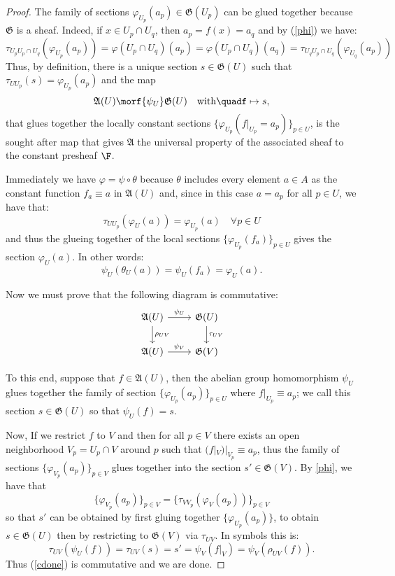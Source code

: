 \begin{proof}
The family of sections $\varphi_{U_p}(a_p)\in \mathfrak{G}(U_p)$ can be glued together
because $\mathfrak{G}$ is a sheaf. Indeed, if $x\in U_p\cap U_q$, then $a_p=f(x)=a_q$
and by (\ref{phi}) we have:
\[
	\tau_{U_p U_p\cap U_q}(\varphi_{U_p}(a_p))=\varphi(U_p\cap U_q)(a_p)=%
	\varphi(U_p\cap U_q)(a_q)=\tau_{U_q U_p\cap U_q}(\varphi_{U_q}(a_p))
\]
Thus, by definition, there is a unique section $s\in\mathfrak{G}(U)$ such that
$\tau_{U U_p}(s)=\varphi_{U_p}(a_p)$ and the map
\[
	\mathfrak{A}(U)\morf{\psi_U}\mathfrak{G}(U) \quad\text{with}\quad%
	f\mapsto s,
\]
that glues together the locally constant sections
$\{\varphi_{U_p}(f|_{U_p}=a_p)\}_{p\in U}$,
is the sought after map that gives $\mathfrak{A}$ the universal property of the
associated sheaf to the constant presheaf $\F$.

Immediately we have $\varphi=\psi\circ\theta$ because $\theta$ includes every
element $a\in A$ as the constant function $f_a\equiv a$ in $\mathfrak{A}(U)$ and,
since in this case $a=a_p$ for all $p\in U$, we have that:
\[
	\tau_{U U_p}(\varphi_U(a))=\varphi_{U_p}(a)  \quad\forall p\in U
\]
and thus the glueing together of the local sections $\{\varphi_{U_p}(f_a)\}_{p\in U}$
gives the section $\varphi_U(a)$. In other words:
\[
	\psi_U(\theta_U(a))=\psi_U(f_a)=\varphi_U(a).
\]

Now we must prove that the following diagram is commutative:
\begin{equation}\label{cdone}
\begin{tikzcd}
\mathfrak{A}(U) \arrow[d,"\rho_{U V}"] \arrow[r,"\psi_U"] & \mathfrak{G}(U) \arrow[d,"\tau_{UV}"] \\
\mathfrak{A}(U) \arrow[r,"\psi_V"]      		 & \mathfrak{G}(V) 
\end{tikzcd}
\end{equation}

To this end, suppose that $f\in\mathfrak{A}(U)$, then the abelian group homomorphism
$\psi_U$ glues together the family of section $\{\varphi_{U_p}(a_p)\}_{p\in U}$ where
$f|_{U_p}\equiv a_p$; we call this section $s\in\mathfrak{G}(U)$ so that $\psi_U(f)=s$.

Now, If we restrict $f$ to $V$ and then for all $p\in V$ there exists an open
neighborhood $V_p=U_p\cap V$ around $p$ such that $(f|_V)|_{V_p}\equiv a_p$, thus the
family of sections $\{\varphi_{V_p}(a_p)\}_{p\in V}$ glues together into the section
$s'\in\mathfrak{G}(V)$. By \ref{phi}, we have that
\[
	\{\varphi_{V_p}(a_p)\}_{p\in V}=\{\tau_{V V_p}(\varphi_V(a_p))\}_{p\in V}
\]
so that $s'$ can be obtained by first gluing together $\{\varphi_{U_p}(a_p)\}$, to
obtain $s\in\mathfrak{G}(U)$ then by restricting to $\mathfrak{G}(V)$ via $\tau_{U V}$.
In symbols this is:
\[
	\tau_{U V}(\psi_U(f))=\tau_{U V}(s)=s'=\psi_V(f|_V)=\psi_V(\rho_{U V}(f)).
\]
Thus (\ref{cdone}) is commutative and we are done.
%
\end{proof}%

